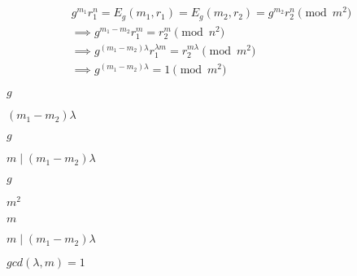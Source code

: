 \documentclass[10pt]{book}
\begin{document}
\begin{mdSnippets}
\begin{mdDisplaySnippet}%
\[%
\begin{aligned}
  g^{m_1}r_1^n = E_g(m_1,r_1) = E_g(m_2,r_2) = g^{m_2}r_2^n \pmod{m^2}\\
  \implies g^{m_1 - m_2}r_1^m = r_2^m \pmod{n^2} \\
  \implies  g^{(m_1 - m_2)\lambda} r_1^{\lambda m} = r_2^{m\lambda} \pmod{m^2} \\
  \implies g^{(m_1 - m_2)\lambda} = 1 \pmod {m^2}
\end{aligned}
\]%
\end{mdDisplaySnippet}%
\begin{mdInlineSnippet}[b2f5ff47436671b6e533d8dc3614845d]%
$g$\end{mdInlineSnippet}%
\begin{mdInlineSnippet}[77337464db5f92230995c3873d861a16]%
$(m_1 - m_2)\lambda$\end{mdInlineSnippet}%
\begin{mdInlineSnippet}[b2f5ff47436671b6e533d8dc3614845d]%
$g$\end{mdInlineSnippet}%
\begin{mdInlineSnippet}[3beb346607c2fc3615f90486b290a1ca]%
$m \mid (m_1 - m_2)\lambda$\end{mdInlineSnippet}%
\begin{mdInlineSnippet}[b2f5ff47436671b6e533d8dc3614845d]%
$g$\end{mdInlineSnippet}%
\begin{mdInlineSnippet}[e09d672ddab652ec34133c73dc054f2e]%
$m^2$\end{mdInlineSnippet}%
\begin{mdInlineSnippet}[6f8f57715090da2632453988d9a1501b]%
$m$\end{mdInlineSnippet}%
\begin{mdInlineSnippet}[ad90fe8ec220c3023c1967d1946c71a1]%
$m \mid (m_1 - m_2) \lambda$\end{mdInlineSnippet}%
\begin{mdInlineSnippet}[11f638e64c5ce6455d9b55619a486829]%
$gcd(\lambda,m) = 1$\end{mdInlineSnippet}%
\begin{mdInlineSnippet}[0f0f72548b5414bc3c9ec0b0e120383d]%

\end{mdInlineSnippet}
\end{mdSnippets}
\end{document}
